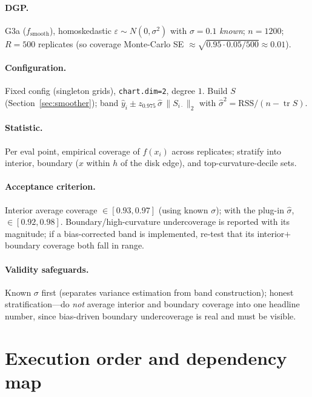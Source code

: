 \documentclass[11pt]{article}
\newcommand{\code}[1]{\texttt{#1}}
\newcommand{\tr}{\operatorname{tr}}
\begin{document}
\paragraph{DGP.} G3a ($f_{\mathrm{smooth}}$), homoskedastic $\varepsilon\sim N(0,\sigma^2)$ with
$\sigma=0.1$ \emph{known}; $n=1200$; $R=500$ replicates (so coverage Monte-Carlo SE
$\approx\sqrt{0.95\cdot0.05/500}\approx 0.01$).

\paragraph{Configuration.} Fixed config (singleton grids), \code{chart.dim=2}, degree $1$. Build
$S$ (Section~\ref{sec:smoother}); band
$\hat y_i \pm z_{0.975}\,\hat\sigma\,\lVert S_{i\cdot}\rVert_2$ with $\hat\sigma^2=\mathrm{RSS}/(n-\tr S)$.

\paragraph{Statistic.} Per eval point, empirical coverage of $f(x_i)$ across replicates; stratify
into interior, boundary ($x$ within $h$ of the disk edge), and top-curvature-decile sets.

\paragraph{Acceptance criterion.} Interior average coverage $\in[0.93,0.97]$ (using known $\sigma$);
with the plug-in $\hat\sigma$, $\in[0.92,0.98]$. Boundary/high-curvature undercoverage is reported
with its magnitude; if a bias-corrected band is implemented, re-test that its interior$+$boundary
coverage both fall in range.

\paragraph{Validity safeguards.} Known $\sigma$ first (separates variance estimation from band
construction); honest stratification—do \emph{not} average interior and boundary coverage into one
headline number, since bias-driven boundary undercoverage is real and must be visible.

\section{Execution order and dependency map}
\end{document}
